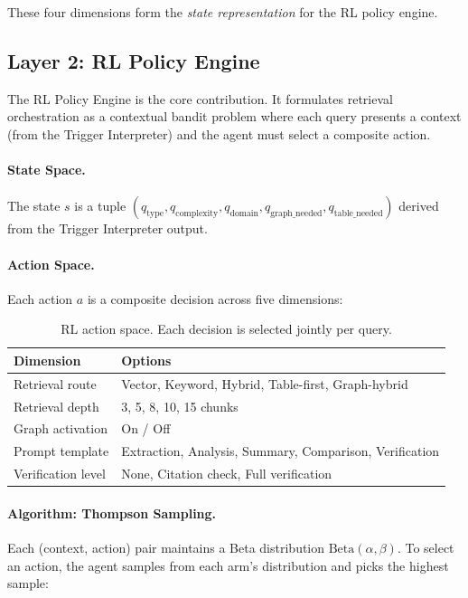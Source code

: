 \documentclass[11pt]{article}
\begin{document}
These four dimensions form the \textit{state representation} for the RL policy engine.

\subsection{Layer 2: RL Policy Engine}
\label{sec:rl}

The RL Policy Engine is the core contribution. It formulates retrieval orchestration as a contextual bandit problem where each query presents a context (from the Trigger Interpreter) and the agent must select a composite action.

\paragraph{State Space.} The state $s$ is a tuple $(q_{\text{type}}, q_{\text{complexity}}, q_{\text{domain}}, q_{\text{graph\_needed}}, q_{\text{table\_needed}})$ derived from the Trigger Interpreter output.

\paragraph{Action Space.} Each action $a$ is a composite decision across five dimensions:

\begin{table}[H]
    \centering
    \small
    \begin{tabular}{@{}ll@{}}
        \toprule
        \textbf{Dimension} & \textbf{Options} \\
        \midrule
        Retrieval route & Vector, Keyword, Hybrid, Table-first, Graph-hybrid \\
        Retrieval depth & 3, 5, 8, 10, 15 chunks \\
        Graph activation & On / Off \\
        Prompt template & Extraction, Analysis, Summary, Comparison, Verification \\
        Verification level & None, Citation check, Full verification \\
        \bottomrule
    \end{tabular}
    \caption{RL action space. Each decision is selected jointly per query.}
    \label{tab:actions}
\end{table}

\paragraph{Algorithm: Thompson Sampling.} Each (context, action) pair maintains a Beta distribution $\text{Beta}(\alpha, \beta)$. To select an action, the agent samples from each arm's distribution and picks the highest sample:
\end{document}
